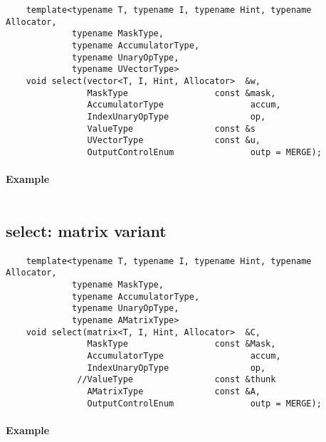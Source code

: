 \begin{verbatim}
    template<typename T, typename I, typename Hint, typename Allocator,
             typename MaskType,
             typename AccumulatorType,
             typename UnaryOpType,
             typename UVectorType>
    void select(vector<T, I, Hint, Allocator>  &w,
                MaskType                 const &mask,
                AccumulatorType                 accum,
                IndexUnaryOpType                op,
                ValueType                const &s
                UVectorType              const &u,
                OutputControlEnum               outp = MERGE);
\end{verbatim}


\paragraph{Example}

\begin{verbatim}

\end{verbatim}


\subsection{{\sf select}: matrix variant}

\paragraph{\syntax}

\begin{verbatim}
    template<typename T, typename I, typename Hint, typename Allocator,
             typename MaskType,
             typename AccumulatorType,
             typename UnaryOpType,
             typename AMatrixType>
    void select(matrix<T, I, Hint, Allocator>  &C,
                MaskType                 const &Mask,
                AccumulatorType                 accum,
                IndexUnaryOpType                op,
              //ValueType                const &thunk
                AMatrixType              const &A,
                OutputControlEnum               outp = MERGE);
\end{verbatim}


\paragraph{Example}

